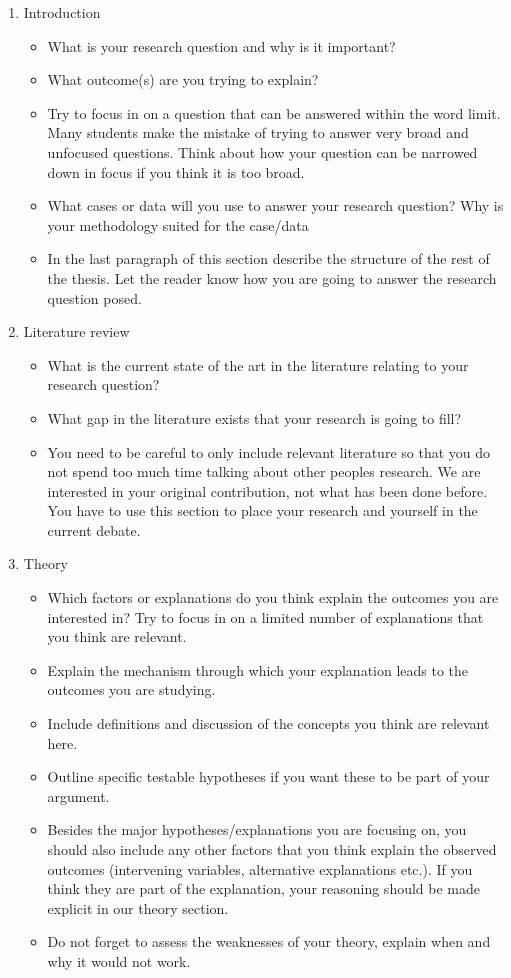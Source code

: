 \documentclass[a4paper,12pt]{article}
\begin{document}
\begin{enumerate}
    \item Introduction
	\begin{itemize}
		\item What is your research question and why is it important?
		\item What outcome(s) are you trying to explain? 
		\item Try to focus in on a question that can be answered within the word limit. Many students make the mistake of trying to answer very broad and unfocused questions. Think about how your question can be narrowed down in focus if you think it is too broad.
		\item What cases or data will you use to answer your research question? Why is your methodology suited for the case/data
		\item In the last paragraph of this section describe the structure of the rest of the thesis. Let the reader know how you are going to answer the research question posed.
	\end{itemize}
	
	\item Literature review
	\begin{itemize}
		\item What is the current state of the art in the literature relating to your research question?
		\item What gap in the literature exists that your research is going to fill?
		\item You need to be careful to only include relevant literature so that you do not spend too much time talking about other peoples research. We are interested in your original contribution, not what has been done before. You have to use this section to place your research and yourself in the current debate.
	\end{itemize}

	\item Theory
	\begin{itemize}
		\item Which factors or explanations do you think explain the outcomes you are interested in? Try to focus in on a limited number of explanations that you think are relevant.
		\item Explain the mechanism through which your explanation leads to the outcomes you are studying.
		\item Include definitions and discussion of the concepts you think are relevant here.
		\item Outline specific testable hypotheses if you want these to be part of your argument.
		\item Besides the major hypotheses/explanations you are focusing on, you should also include any other factors that you think explain the observed outcomes (intervening variables, alternative explanations etc.). If you think they are part of the explanation, your reasoning should be made explicit in our theory section.
		\item Do not forget to assess the weaknesses of your theory, explain when and why it would not work.
	\end{itemize}


\end{enumerate}
\end{document}
